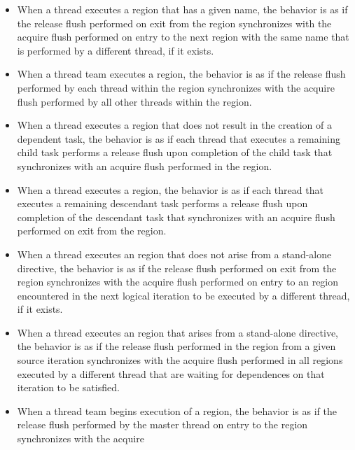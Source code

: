\begin{itemize}
\item When a thread executes a  region that has a given
      name, the behavior is as if the release flush performed on exit from
      the region synchronizes with the acquire flush performed on entry to
      the next  region with the same name that is performed
      by a different thread, if it exists.
\item When a thread team executes a  region, the
      behavior is as if the release flush performed by each thread within
      the region synchronizes with the acquire flush performed by all other
      threads within the region.
\item When a thread executes a  region that does not result
      in the creation of a dependent task, the behavior is as if each thread
      that executes a remaining child task performs a release flush upon
      completion of the child task that synchronizes with an acquire flush
      performed in the  region.
\item When a thread executes a  region, the behavior is as
      if each thread that executes a remaining descendant task performs a
      release flush upon completion of the descendant task that synchronizes
      with an acquire flush performed on exit from the  region.
\item When a thread executes an  region that does not arise from
      a stand-alone  directive, the behavior is as if the
      release flush performed on exit from the region
      synchronizes with the acquire flush performed on entry to an
       region encountered in the next logical iteration to be
      executed by a different thread, if it exists.
\item When a thread executes an  region that arises from a
      stand-alone  directive, the behavior is as if the
      release flush performed in the  region from a given
      source iteration synchronizes with the acquire flush performed in all
       regions executed by a different thread that are waiting
      for dependences on that iteration to be satisfied.
\item When a thread team begins execution of a  region, the
      behavior is as if the release flush performed by the master thread on
      entry to the  region synchronizes with the acquire

\end{itemize}
